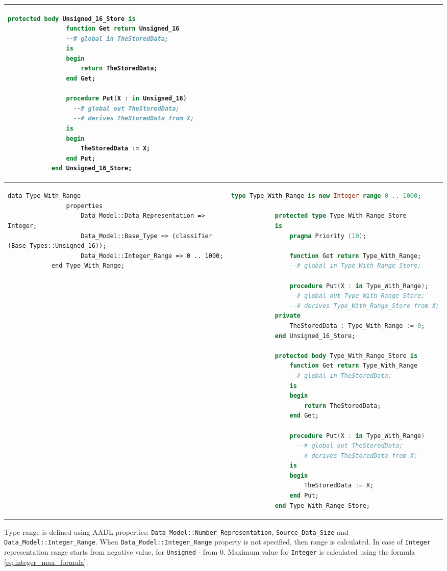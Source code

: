 \begin{center}
\begin{longtable}{| p{2in} | p{4in} |}
\begin{lstlisting}[language=ada]
		    protected body Unsigned_16_Store is
		        function Get return Unsigned_16
		        --# global in TheStoredData;
		        is
		        begin
		            return TheStoredData;
		        end Get;

		        procedure Put(X : in Unsigned_16)
		          --# global out TheStoredData;
		          --# derives TheStoredData from X;
		        is
		        begin
		            TheStoredData := X;
		        end Put;
		    end Unsigned_16_Store;

		\end{lstlisting}

		\\ \hline

		\begin{lstlisting}[language=aadl]
			data Type_With_Range
				properties
					Data_Model::Data_Representation => Integer;
					Data_Model::Base_Type => (classifier (Base_Types::Unsigned_16));
					Data_Model::Integer_Range => 0 .. 1000;
			end Type_With_Range;
		\end{lstlisting} 
		&
		\begin{lstlisting}[language=ada]
			type Type_With_Range is new Integer range 0 .. 1000;
    
		    protected type Type_With_Range_Store
		    is
		        pragma Priority (10);

		        function Get return Type_With_Range;
		        --# global in Type_With_Range_Store;

		        procedure Put(X : in Type_With_Range);
		        --# global out Type_With_Range_Store;
		        --# derives Type_With_Range_Store from X;
		    private
		        TheStoredData : Type_With_Range := 0;
		    end Unsigned_16_Store;

		    protected body Type_With_Range_Store is
		        function Get return Type_With_Range
		        --# global in TheStoredData;
		        is
		        begin
		            return TheStoredData;
		        end Get;

		        procedure Put(X : in Type_With_Range)
		          --# global out TheStoredData;
		          --# derives TheStoredData from X;
		        is
		        begin
		            TheStoredData := X;
		        end Put;
		    end Type_With_Range_Store;

		\end{lstlisting}
	\end{longtable}
\end{center}
\doublespacing

Type range is defined using AADL properties: \lstinline{Data_Model::Number_Representation}, \lstinline{Source_Data_Size} and \lstinline{Data_Model::Integer_Range}. When \lstinline{Data_Model::Integer_Range} property is not specified, then range is calculated. In case of \lstinline{Integer} representation range starts from negative value, for \lstinline{Unsigned} - from 0. Maximum value for \lstinline{Integer} is calculated using the formula \ref{eq:integer_max_formula}. 

